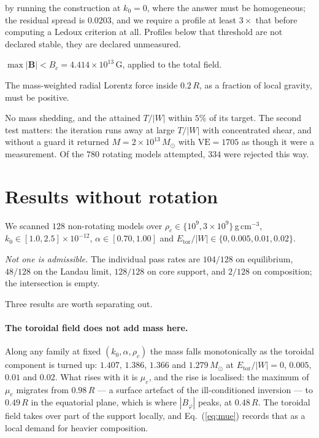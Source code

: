 \documentclass{aa}
\begin{document}
\begin{description}
      by running the construction at $k_0 = 0$, where the answer must be
      homogeneous; the residual spread is $0.0203$, and we require a
      profile at least $3\times$ that before computing a Ledoux
      criterion at all. Profiles below that threshold are not declared
      stable, they are declared unmeasured.
\item[Landau.] $\max|\mathbf{B}| < B_c = 4.414\times10^{13}$\,G, applied
      to the total field.
\item[Core support.] The mass-weighted radial Lorentz force inside
      $0.2\,R$, as a fraction of local gravity, must be positive.
\item[Rotation.] No mass shedding, and the attained $T/|W|$ within $5\%$
      of its target. The second test matters: the iteration runs away at
      large $T/|W|$ with concentrated shear, and without a guard it
      returned $M = 2\times10^{13}\,M_\odot$ with $\mathrm{VE} = 1705$ as
      though it were a measurement. Of the $780$ rotating models
      attempted, $334$ were rejected this way.
\end{description}


\section{Results without rotation}
\label{sec:results-mixed}

We scanned $128$ non-rotating models over
$\rho_c \in \{10^9, 3\times10^9\}$\,g\,cm$^{-3}$,
$k_0 \in [1.0,2.5]\times10^{-12}$,
$\alpha \in [0.70, 1.00]$ and
$E_{\mathrm{tor}}/|W| \in \{0, 0.005, 0.01, 0.02\}$.

\emph{Not one is admissible.} The individual pass rates are
$104/128$ on equilibrium, $48/128$ on the Landau limit,
$128/128$ on core support, and $2/128$ on composition; the intersection
is empty.

Three results are worth separating out.

\paragraph{The toroidal field does not add mass here.} Along any family
at fixed $(k_0,\alpha,\rho_c)$ the mass falls monotonically as the
toroidal component is turned up: $1.407$, $1.386$, $1.366$ and
$1.279\,M_\odot$ at $E_{\mathrm{tor}}/|W| = 0$, $0.005$, $0.01$ and
$0.02$. What rises with it is $\mu_e$, and the rise is localised: the
maximum of $\mu_e$ migrates from $0.98\,R$ --- a surface artefact of the
ill-conditioned inversion --- to $0.49\,R$ in the equatorial plane, which
is where $|B_\varphi|$ peaks, at $0.48\,R$. The toroidal field takes over
part of the support locally, and Eq.~(\ref{eq:mue}) records that as a
local demand for heavier composition.
\end{document}
